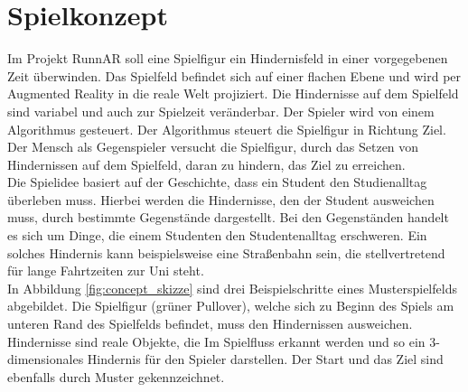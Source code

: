 \section{Spielkonzept}
Im Projekt RunnAR soll eine Spielfigur ein Hindernisfeld in einer vorgegebenen Zeit überwinden. Das Spielfeld befindet sich auf einer flachen Ebene und wird per Augmented Reality in die reale Welt projiziert. Die Hindernisse auf dem Spielfeld sind variabel und auch zur Spielzeit veränderbar. Der Spieler wird von einem Algorithmus gesteuert. Der Algorithmus steuert die Spielfigur in Richtung Ziel. Der Mensch als Gegenspieler versucht die Spielfigur, durch das Setzen von Hindernissen auf dem Spielfeld, daran zu hindern, das Ziel zu erreichen.\\
Die Spielidee basiert auf der Geschichte, dass ein Student den Studienalltag überleben muss. Hierbei werden die Hindernisse, den der Student ausweichen muss, durch bestimmte Gegenstände dargestellt. Bei den Gegenständen handelt es sich um Dinge, die einem Studenten den Studentenalltag erschweren. Ein solches Hindernis kann beispielsweise eine Straßenbahn sein, die stellvertretend für lange Fahrtzeiten zur Uni steht.\\
In Abbildung \ref{fig:concept_skizze} sind drei Beispielschritte eines Musterspielfelds abgebildet. Die Spielfigur (grüner Pullover), welche sich zu Beginn des Spiels am unteren Rand des Spielfelds befindet, muss den Hindernissen ausweichen. Hindernisse sind reale Objekte, die Im Spielfluss erkannt werden und so ein 3-dimensionales Hindernis für den Spieler darstellen. Der Start und das Ziel sind ebenfalls durch Muster gekennzeichnet. 


